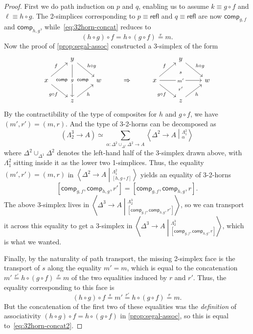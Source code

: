 \documentclass{amsart}
\theoremstyle{plain}
\theoremstyle{definition}
\theoremstyle{remark}
\numberwithin{equation}{section}
\newcommand{\ndexten}[4]{\left\langle #1 \to #2 \middle|^{#3}_{#4}\right\rangle}
\newcommand{\jdeq}{\equiv}
\newcommand{\refl}{\mathsf{refl}}
\newcommand{\iscomp}[2]{\mathsf{comp}_{#1,#2}}
\begin{document}
\begin{proof}
  First we do path induction on $p$ and $q$, enabling us to assume $k\jdeq g\circ f$ and $\ell\jdeq h\circ g$.
  The 2-simplices corresponding to $p\jdeq \refl$ and $q\jdeq \refl$ are now $\iscomp g f$ and $\iscomp h g$, while~\eqref{eq:32horn-concat} reduces to
  \begin{equation}
    (h\circ g) \circ f = h \circ (g\circ f) \overset r= m.\label{eq:32horn-concat2}
  \end{equation}
  Now the proof of \cref{prop:segal-assoc} constructed a 3-simplex of the form
  \[
  \begin{tikzcd}
    & y \ar[dd,"g" description] \ar[dr,"h\circ g"] &&&& y \ar[dr,"h\circ g"] \\
    x \ar[ur,"f"] \ar[dr,"g\circ f"'] \ar[rr,phantom,"\scriptstyle \mathsf{comp}" near start, "\scriptstyle \mathsf{comp}" near end] && w & \Rightarrow & x \ar[ur,"f"] \ar[dr,"g\circ f"'] \ar[rr,"m'" description] && w \\
    & z \ar[ur,"h"'] &&&& z \ar[ur,"h"'] \ar[uu,phantom,"\scriptstyle r'" near start,"\scriptstyle s" near end]
  \end{tikzcd}
  \]
  By the contractibility of the type of composites for $h$ and $g\circ f$, we have $(m',r') = (m,r)$.
  And the type of 3-2-horns can be decomposed as
  \[ (\Lambda^3_2\to A) \simeq \sum_{\alpha : \Delta^2 \cup_{\Delta^1} \Delta^2 \to A} \ndexten{\Delta^2}{A}{\Lambda^2_1}{\alpha} \]
  where $\Delta^2 \cup_{\Delta^1} \Delta^2$ denotes the left-hand half of the 3-simplex drawn above, with $\Lambda^2_1$ sitting inside it as the lower two 1-simplices.
  Thus, the equality $(m',r') = (m,r)$ in $\ndexten{\Delta^2}{A}{\Lambda^2_1}{[h,g\circ f]}$ yields an equality of 3-2-horns
  \[[\iscomp g f,\iscomp h g,r'] = [\iscomp g f,\iscomp h g,r].\]
  The above 3-simplex lives in $\ndexten{\Delta^3}{A}{\Lambda^3_2}{[\iscomp g f,\iscomp h g,r']}$, so we can transport it across this equality to get a 3-simplex in $\ndexten{\Delta^3}{A}{\Lambda^3_2}{[\iscomp g f,\iscomp h g,r]}$, which is what we wanted.

  Finally, by the naturality of path transport, the missing 2-simplex face is the transport of $s$ along the equality $m'=m$, which is equal to the concatenation $m' \overset {r'}= h\circ (g\circ f) \overset{r}= m$ of the two equalities induced by $r$ and $r'$.
  Thus, the equality corresponding to this face is
  \[ (h\circ g) \circ f \overset s= m' \overset {r'}= h\circ (g\circ f) \overset{r}= m. \]
  But the concatenation of the first two of these equalities was the \emph{definition} of associativity $(h\circ g) \circ f = h \circ (g\circ f)$ in \cref{prop:segal-assoc}, so this is equal to~\eqref{eq:32horn-concat2}.
\end{proof}
\end{document}
